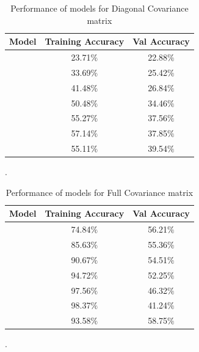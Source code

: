 {
\begin{table}[!h]
\centering
\begin{tabular}{ |c|c|c|  }
\hline
\rowcolor{lightgray} Model & Training Accuracy & Val Accuracy \\
\hline
[1,1,1,1,1] & 23.71$\%$  & 22.88$\%$ \\   
 \hline
[2,2,2,2,2] & 33.69$\%$  & 25.42$\%$ \\ 
\hline
[3,3,3,3,3] & 41.48$\%$  & 26.84$\%$ \\
\hline
[4,4,4,4,4] & 50.48$\%$  & 34.46$\%$ \\
\hline
[5,5,5,5,5] & 55.27$\%$  & 37.56$\%$ \\
\hline
[6,6,6,6,6] & 57.14$\%$  & 37.85$\%$ \\
\hline
[6,5,6,6,4] & 55.11$\%$  & 39.54$\%$ \\
\hline
\end{tabular}
\caption{Performance of models for Diagonal Covariance matrix}.
\label{table:7}
\end{table}
}
\newpage
{
\begin{table}[!h]
\centering
\begin{tabular}{ |c|c|c|  }
\hline
\rowcolor{lightgray} Model & Training Accuracy & Val Accuracy \\
\hline
[1,1,1,1,1] & 74.84$\%$  & 56.21$\%$ \\   
 \hline
[2,2,2,2,2] & 85.63$\%$  & 55.36$\%$ \\ 
\hline
[3,3,3,3,3] & 90.67$\%$  & 54.51$\%$ \\
\hline
[4,4,4,4,4] & 94.72$\%$  & 52.25$\%$ \\
\hline
[5,5,5,5,5] & 97.56$\%$  & 46.32$\%$ \\
\hline
[6,6,6,6,6] & 98.37$\%$  & 41.24$\%$ \\
\hline
[3,3,4,5,2] & 93.58$\%$  & 58.75$\%$ \\
\hline
\end{tabular}
\caption{Performance of models for Full Covariance matrix}.
\label{table:8}
\end{table}
}

